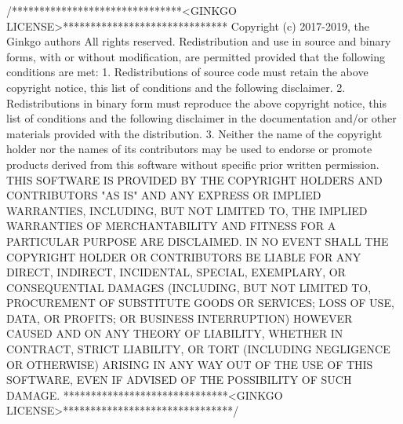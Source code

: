 \begin{DoxyCodeInclude}
\textcolor{comment}{/*******************************<GINKGO LICENSE>******************************}
\textcolor{comment}{Copyright (c) 2017-2019, the Ginkgo authors}
\textcolor{comment}{All rights reserved.}
\textcolor{comment}{}
\textcolor{comment}{Redistribution and use in source and binary forms, with or without}
\textcolor{comment}{modification, are permitted provided that the following conditions}
\textcolor{comment}{are met:}
\textcolor{comment}{}
\textcolor{comment}{1. Redistributions of source code must retain the above copyright}
\textcolor{comment}{notice, this list of conditions and the following disclaimer.}
\textcolor{comment}{}
\textcolor{comment}{2. Redistributions in binary form must reproduce the above copyright}
\textcolor{comment}{notice, this list of conditions and the following disclaimer in the}
\textcolor{comment}{documentation and/or other materials provided with the distribution.}
\textcolor{comment}{}
\textcolor{comment}{3. Neither the name of the copyright holder nor the names of its}
\textcolor{comment}{contributors may be used to endorse or promote products derived from}
\textcolor{comment}{this software without specific prior written permission.}
\textcolor{comment}{}
\textcolor{comment}{THIS SOFTWARE IS PROVIDED BY THE COPYRIGHT HOLDERS AND CONTRIBUTORS "AS}
\textcolor{comment}{IS" AND ANY EXPRESS OR IMPLIED WARRANTIES, INCLUDING, BUT NOT LIMITED}
\textcolor{comment}{TO, THE IMPLIED WARRANTIES OF MERCHANTABILITY AND FITNESS FOR A}
\textcolor{comment}{PARTICULAR PURPOSE ARE DISCLAIMED. IN NO EVENT SHALL THE COPYRIGHT}
\textcolor{comment}{HOLDER OR CONTRIBUTORS BE LIABLE FOR ANY DIRECT, INDIRECT, INCIDENTAL,}
\textcolor{comment}{SPECIAL, EXEMPLARY, OR CONSEQUENTIAL DAMAGES (INCLUDING, BUT NOT}
\textcolor{comment}{LIMITED TO, PROCUREMENT OF SUBSTITUTE GOODS OR SERVICES; LOSS OF USE,}
\textcolor{comment}{DATA, OR PROFITS; OR BUSINESS INTERRUPTION) HOWEVER CAUSED AND ON ANY}
\textcolor{comment}{THEORY OF LIABILITY, WHETHER IN CONTRACT, STRICT LIABILITY, OR TORT}
\textcolor{comment}{(INCLUDING NEGLIGENCE OR OTHERWISE) ARISING IN ANY WAY OUT OF THE USE}
\textcolor{comment}{OF THIS SOFTWARE, EVEN IF ADVISED OF THE POSSIBILITY OF SUCH DAMAGE.}
\textcolor{comment}{******************************<GINKGO LICENSE>*******************************/}


\end{DoxyCodeInclude}
